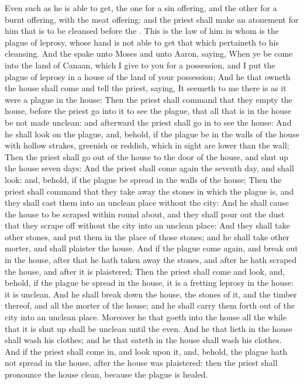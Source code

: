 \begin{biblechapter}
\verse Even such as he is able to get, the one for a sin offering, and the other for a burnt offering, with the meat offering: and the priest shall make an atonement for him that is to be cleansed before the \LORD.
\verse This is the law of him in whom is the plague of leprosy, whose hand is not able to get that which pertaineth to his cleansing.
 And the \LORD spake unto Moses and unto Aaron, saying,
\verse When ye be come into the land of Canaan, which I give to you for a possession, and I put the plague of leprosy in a house of the land of your possession;
\verse And he that owneth the house shall come and tell the priest, saying, It seemeth to me there is as it were a plague in the house:
\verse Then the priest shall command that they empty the house, before the priest go into it to see the plague, that all that is in the house be not made unclean: and afterward the priest shall go in to see the house:
\verse And he shall look on the plague, and, behold, if the plague be in the walls of the house with hollow strakes, greenish or reddish, which in sight are lower than the wall;
\verse Then the priest shall go out of the house to the door of the house, and shut up the house seven days:
\verse And the priest shall come again the seventh day, and shall look: and, behold, if the plague be spread in the walls of the house;
\verse Then the priest shall command that they take away the stones in which the plague is, and they shall cast them into an unclean place without the city:
\verse And he shall cause the house to be scraped within round about, and they shall pour out the dust that they scrape off without the city into an unclean place:
\verse And they shall take other stones, and put them in the place of those stones; and he shall take other morter, and shall plaister the house.
\verse And if the plague come again, and break out in the house, after that he hath taken away the stones, and after he hath scraped the house, and after it is plaistered;
\verse Then the priest shall come and look, and, behold, if the plague be spread in the house, it is a fretting leprosy in the house: it is unclean.
\verse And he shall break down the house, the stones of it, and the timber thereof, and all the morter of the house; and he shall carry them forth out of the city into an unclean place.
\verse Moreover he that goeth into the house all the while that it is shut up shall be unclean until the even.
\verse And he that lieth in the house shall wash his clothes; and he that eateth in the house shall wash his clothes.
\verse And if the priest shall come in, and look upon it, and, behold, the plague hath not spread in the house, after the house was plaistered: then the priest shall pronounce the house clean, because the plague is healed.

\end{biblechapter}
